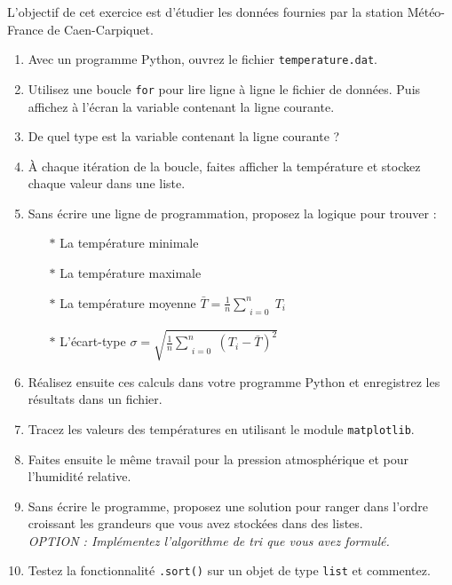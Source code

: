 L'objectif de cet  exercice est d'étudier les données  fournies par la
station Météo-France de Caen-Carpiquet.
\begin{enumerate}
\item Avec un programme Python, ouvrez le fichier \texttt{temperature.dat}.

\item Utilisez une boucle \texttt{for} pour lire ligne à ligne le fichier de données.
  Puis affichez à l'écran la variable contenant la ligne courante.

\item De quel type est la variable contenant la ligne courante ?


\item À chaque itération de la boucle, faites afficher la température et stockez chaque valeur dans une liste.

\item Sans écrire une ligne de programmation, proposez la logique pour trouver :
  \begin{itemize}
  \item[$\ast$] La température minimale
  \item[$\ast$] La température maximale
  \item[$\ast$] La température moyenne    $ \bar{T}= \frac{1}{n}  \sum\limits_{\substack{i=0}}^{n}{T_i}$
  \item[$\ast$] L'écart-type  $\sigma = \sqrt{\frac{1}{n}  \sum\limits_{\substack{i=0}}^{n}{} (T_i-\bar{T})^2   }$
  \end{itemize}

\item Réalisez ensuite ces calculs dans votre programme Python et enregistrez les résultats dans un fichier.

\item Tracez les valeurs des températures en utilisant le module \texttt{matplotlib}.

\item Faites ensuite le même travail pour la pression atmosphérique et pour l'humidité relative.

\item Sans écrire le programme, proposez une solution pour ranger dans l'ordre croissant
  les grandeurs que vous avez stockées dans des listes.\\
  \textit{OPTION : Implémentez l'algorithme de tri que vous avez formulé.}

\item Testez la fonctionnalité \texttt{.sort()} sur un objet de type \texttt{list} et commentez.

\end{enumerate}
